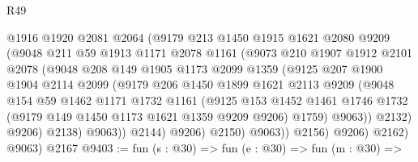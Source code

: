 \begin{lexlean}{R49}
\begin{coremodule}
                      @1916
                      @1920
                      @2081
                      @2064
                      (@9179
                        @213
                        @1450
                        @1915
                        @1621
                        @2080
                        @9209
                        (@9048
                          @211
                          @59
                          @1913
                          @1171
                          @2078
                          @1161
                          (@9073
                            @210
                            @1907
                            @1912
                            @2101
                            @2078
                            (@9048
                              @208
                              @149
                              @1905
                              @1173
                              @2099
                              @1359
                              (@9125
                                @207
                                @1900
                                @1904
                                @2114
                                @2099
                                (@9179
                                  @206
                                  @1450
                                  @1899
                                  @1621
                                  @2113
                                  @9209
                                  (@9048
                                    @154
                                    @59
                                    @1462
                                    @1171
                                    @1732
                                    @1161
                                    (@9125
                                      @153
                                      @1452
                                      @1461
                                      @1746
                                      @1732
                                      (@9179 @149 @1450 @1173 @1621 @1359 @9209 @9206)
                                      @1759)
                                    @9063))
                                @2132)
                              @9206)
                            @2138)
                          @9063))
                      @2144)
                    @9206)
                  @2150)
                @9063))
            @2156)
          @9206)
        @2162)
      @9063)
    @2167
@9403 := fun (s : @30) =>
  fun (e : @30) =>
  fun (m : @30) =>

\end{coremodule}
\end{lexlean}
